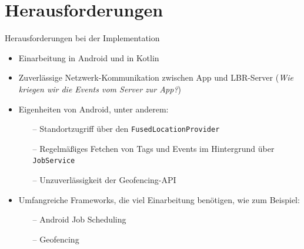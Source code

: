 \documentclass{beamer}
\begin{document}
	\section{Herausforderungen}
	\begin{frame}{Herausforderungen bei der Implementation}
		\begin{itemize}
			\item \alert<1>{Einarbeitung} in Android und in Kotlin
			\item Zuverlässige \alert<2>{Netzwerk-Kommunikation} zwischen App und LBR-Server (\textit{Wie kriegen wir die Events vom Server zur App?})
			\item \alert<3>{Eigenheiten} von Android, unter anderem:
				\begin{itemize}
					\item[--] Standortzugriff über den \texttt{FusedLocationProvider}
					\item[--] Regelmäßiges Fetchen von Tags und Events im Hintergrund über \texttt{JobService}
					\item[--] Unzuverlässigkeit der Geofencing-API
				\end{itemize}
			\item Umfangreiche \alert<4>{Frameworks}, die viel Einarbeitung benötigen, wie zum Beispiel:
				\begin{itemize}
					\item[--] Android Job Scheduling
					\item[--] Geofencing
				\end{itemize}
		\end{itemize}
	\end{frame}
\end{document}
